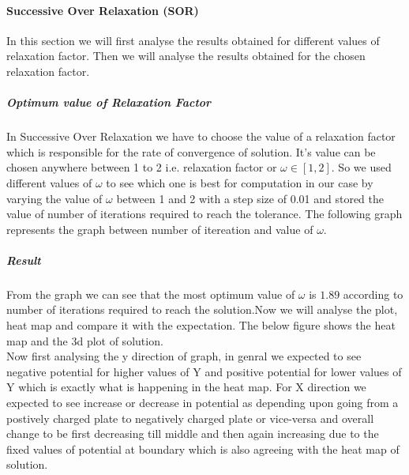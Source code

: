 \paragraph{Successive Over Relaxation (SOR)}
In this section we will first analyse the results obtained for different values of relaxation factor. Then we will analyse the results obtained for the chosen relaxation factor.
\subparagraph{Optimum value of Relaxation Factor}
In Successive Over Relaxation we have to choose the value of a relaxation factor which is responsible for the rate of convergence of solution. It's value can be chosen anywhere between 1 to 2 i.e. relaxation factor or $ \omega  \in [1,2] $. So we used different values of $ \omega $ to see which one is best for computation in our case by varying the value of $\omega$ between 1 and 2 with a step size of 0.01 and stored the value of number of iterations  required to reach the tolerance. The following graph represents the graph between number of itereation and value of $ \omega $. \\
\subparagraph{Result}From the graph we can see that the most optimum value of $ \omega $ is $1.89$ according to number of iterations required to reach the solution.Now we will analyse the plot, heat map and  compare it with the expectation. The below figure shows the heat map and the 3d plot of solution. \\
Now first analysing the y direction of graph, in genral we expected to see  negative potential for higher values of Y and positive potential for lower values of Y which is exactly what is happening in the heat map. For X direction we expected to see increase or decrease in potential as depending upon going from a postively charged plate to negatively charged plate or vice-versa and overall change to be first decreasing till middle and then again increasing due to the fixed values of potential at boundary which is also agreeing with the heat map of solution.\\
